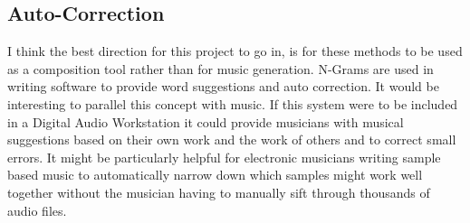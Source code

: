 \documentclass{amsart}
\theoremstyle{definition}
\begin{document}
\subsection{Auto-Correction}

I think the best direction for this project to go in, is for these methods to be used as a composition tool rather than for music generation.
N-Grams are used in writing software to provide word suggestions and auto correction.
It would be interesting to parallel this concept with music.
If this system were to be included in a Digital Audio Workstation it could
provide musicians
with musical suggestions based on their own work and the work of others and to correct small errors.
It might be particularly helpful for electronic musicians writing sample based music to automatically narrow down which samples might work well together without the musician having to manually sift through thousands of audio files.


\newpage

{}

\end{document}
